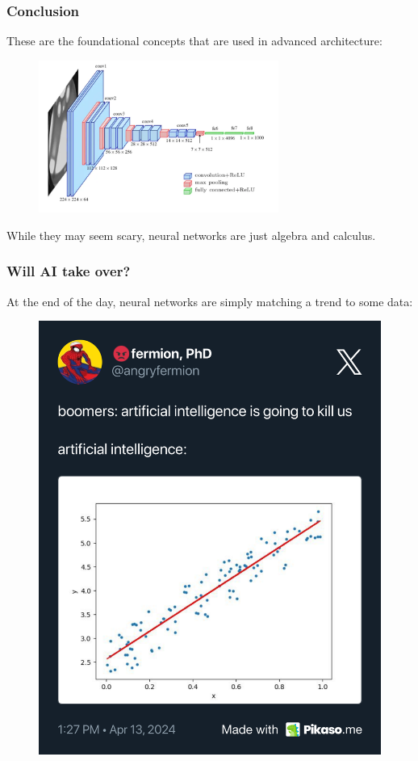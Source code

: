 \documentclass{beamer}
\begin{document}
\begin{frame}
    \frametitle{Conclusion}
    These are the foundational concepts that are used in advanced architecture:
    \begin{figure}
        \centering
        \includegraphics[width=0.7\textwidth]{images/vgg-architecture.png}
    \end{figure}
    While they may seem scary, neural networks are just algebra and calculus.
\end{frame}

\begin{frame}
    \frametitle{Will AI take over?}
    At the end of the day, neural networks are simply matching a trend to some data:
    \begin{figure}
        \centering
        \includegraphics[height=0.75\textheight]{./images/pikaso.me-angryfermion-20240413_132756-1779139460174676132.png}
    \end{figure}
\end{frame}
\end{document}
